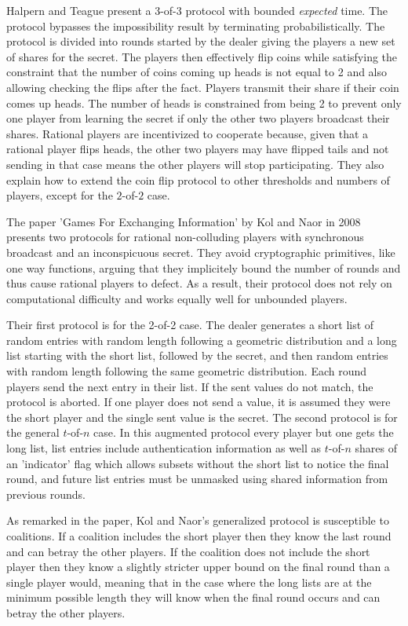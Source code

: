 \documentclass{dalcsthesis}
\begin{document}
Halpern and Teague present a 3-of-3 protocol with bounded \emph{expected} time. The protocol bypasses the impossibility result by terminating probabilistically. The protocol is divided into rounds started by the dealer giving the players a new set of shares for the secret. The players then effectively flip coins while satisfying the constraint that the number of coins coming up heads is not equal to 2 and also allowing checking the flips after the fact. Players transmit their share if their coin comes up heads. The number of heads is constrained from being 2 to prevent only one player from learning the secret if only the other two players broadcast their shares. Rational players are incentivized to cooperate because, given that a rational player flips heads, the other two players may have flipped tails and not sending in that case means the other players will stop participating. They also explain how to extend the coin flip protocol to other thresholds and numbers of players, except for the $2$-of-$2$ case.

The paper 'Games For Exchanging Information' \cite{kol08} by Kol and Naor in 2008 presents two protocols for rational non-colluding players with synchronous broadcast and an inconspicuous secret. They avoid cryptographic primitives, like one way functions, arguing that they implicitely bound the number of rounds and thus cause rational players to defect. As a result, their protocol does not rely on computational difficulty and works equally well for unbounded players.

Their first protocol is for the 2-of-2 case. The dealer generates a short list of random entries with random length following a geometric distribution and a long list starting with the short list, followed by the secret, and then random entries with random length following the same geometric distribution. Each round players send the next entry in their list. If the sent values do not match, the protocol is aborted. If one player does not send a value, it is assumed they were the short player and the single sent value is the secret. The second protocol is for the general $t$-of-$n$ case. In this augmented protocol every player but one gets the long list, list entries include authentication information as well as $t$-of-$n$ shares of an 'indicator' flag which allows subsets without the short list to notice the final round, and future list entries must be unmasked using shared information from previous rounds.

As remarked in the paper, Kol and Naor's generalized protocol is susceptible to coalitions. If a coalition includes the short player then they know the last round and can betray the other players. If the coalition does not include the short player then they know a slightly stricter upper bound on the final round than a single player would, meaning that in the case where the long lists are at the minimum possible length they will know when the final round occurs and can betray the other players.
\end{document}
